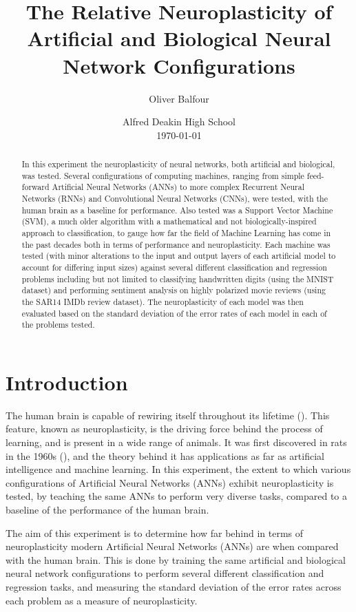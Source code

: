 \documentclass[]{report}
\title{
	The Relative Neuroplasticity of Artificial
	\linebreak
	and Biological Neural Network Configurations
}
\author{Oliver Balfour}
\date{%
	Alfred Deakin High School\\[2ex]%
	\today
}
\begin{document}
\maketitle

\begin{abstract}
	In this experiment the neuroplasticity of neural networks, both artificial and biological, was tested. Several configurations of computing machines, ranging from simple feed-forward Artificial Neural Networks (ANNs) to more complex Recurrent Neural Networks (RNNs) and Convolutional Neural Networks (CNNs), were tested, with the human brain as a baseline for performance. Also tested was a Support Vector Machine (SVM), a much older algorithm with a mathematical and not biologically-inspired approach to classification, to gauge how far the field of Machine Learning has come in the past decades both in terms of performance and neuroplasticity. Each machine was tested (with minor alterations to the input and output layers of each artificial model to account for differing input sizes) against several different classification and regression problems including but not limited to classifying handwritten digits (using the MNIST dataset) and performing sentiment analysis on highly polarized movie reviews (using the SAR14 IMDb review dataset). The neuroplasticity of each model was then evaluated based on the standard deviation of the error rates of each model in each of the problems tested.
\end{abstract}

\tableofcontents
\newpage

\section{Introduction}

The human brain is capable of rewiring itself throughout its lifetime (\cite{draganski2004neuroplasticity}). This feature, known as neuroplasticity, is the driving force behind the process of learning, and is present in a wide range of animals. It was first discovered in rats in the 1960s (\cite{bennett1964chemical}), and the theory behind it has applications as far as artificial intelligence and machine learning. In this experiment, the extent to which various configurations of Artificial Neural Networks (ANNs) exhibit neuroplasticity is tested, by teaching the same ANNs to perform very diverse tasks, compared to a baseline of the performance of the human brain.

The aim of this experiment is to determine how far behind in terms of neuroplasticity modern Artificial Neural Networks (ANNs) are when compared with the human brain. This is done by training the same artificial and biological neural network configurations to perform several different classification and regression tasks, and measuring the standard deviation of the error rates across each problem as a measure of neuroplasticity.
\end{document}
